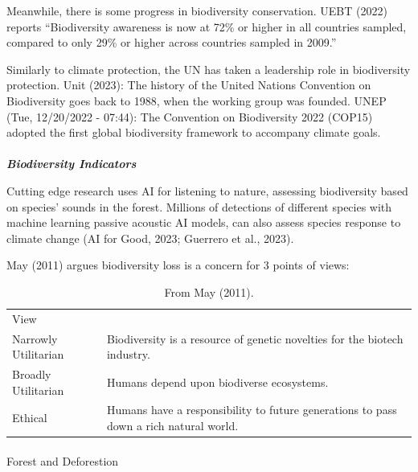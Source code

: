 \documentclass[
  letterpaper,
  DIV=11,
  numbers=noendperiod]{scrartcl}
\makeatletter
\let\oldparagraph\paragraph
\renewcommand{\paragraph}{
    \@ifstar
      \xxxParagraphStar
      \xxxParagraphNoStar
  }
\newcommand{\xxxParagraphStar}[1]{\oldparagraph*{#1}\mbox{}}
\newcommand{\xxxParagraphNoStar}[1]{\oldparagraph{#1}\mbox{}}
\makeatother
\begin{document}
Meanwhile, there is some progress in biodiversity conservation. UEBT
(2022) reports ``Biodiversity awareness is now at 72\% or higher in all
countries sampled, compared to only 29\% or higher across countries
sampled in 2009.''

Similarly to climate protection, the UN has taken a leadership role in
biodiversity protection. Unit (2023): The history of the United Nations
Convention on Biodiversity goes back to 1988, when the working group was
founded. UNEP (Tue, 12/20/2022 - 07:44): The Convention on Biodiversity
2022 (COP15) adopted the first global biodiversity framework to
accompany climate goals.

\paragraph{\texorpdfstring{\textbf{\emph{Biodiversity
Indicators}}}{Biodiversity Indicators}}\label{biodiversity-indicators}

Cutting edge research uses AI for listening to nature, assessing
biodiversity based on species' sounds in the forest. Millions of
detections of different species with machine learning passive acoustic
AI models, can also assess species response to climate change (AI for
Good, 2023; Guerrero et al., 2023).

May (2011) argues biodiversity loss is a concern for 3 points of views:

\begin{longtable}[]{@{}
  >{\raggedright\arraybackslash}p{}
  >{\raggedright\arraybackslash}p{}@{}}
\caption{From May (2011).}\tabularnewline
\toprule\noalign{}
\endfirsthead
\endhead
\bottomrule\noalign{}
\endlastfoot
View & \\
Narrowly Utilitarian & Biodiversity is a resource of genetic novelties
for the biotech industry. \\
Broadly Utilitarian & Humans depend upon biodiverse ecosystems. \\
Ethical & Humans have a responsibility to future generations to pass
down a rich natural world. \\
\end{longtable}

\paragraph{Forest and Deforestion}\label{forest-and-deforestion}
\end{document}
